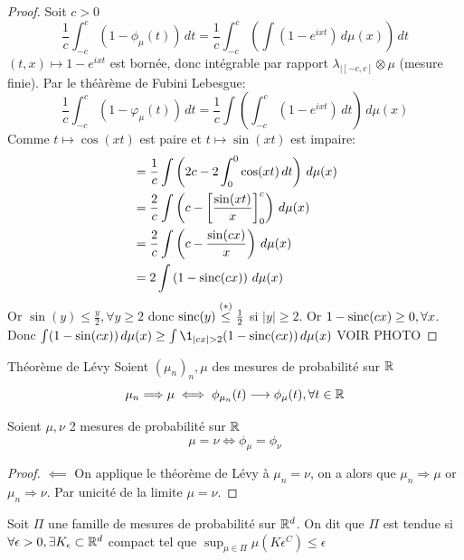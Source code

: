 \documentclass[]{report}
\begin{document}
    \begin{proof}
        Soit $c>0$
        \[\frac{1}{c}\int_{-c}^{c}(1-\phi_\mu(t))\,dt=\frac{1}{c}\int_{-c}^{c}\left(\int (1-e^{ixt})\,d\mu(x)\right)\,dt\]
        $(t,x)\mapsto 1-e^{ixt}$ est bornée, donc intégrable par rapport $\lambda_{|[-c,c]}\otimes \mu$ (mesure finie). Par le théàrème de Fubini Lebesgue:
        \[\frac{1}{c}\int_{-c}^{c}(1-\varphi_\mu(t))\,dt=\frac{1}{c}\int \left(\int_{-c}^{c}(1-e^{ixt})\,dt\right)\,d\mu(x)\]
        Comme $t\mapsto \cos(xt)$ est paire et $t\mapsto \sin(xt)$ est impaire:
        \begin{align*}
            &=\frac{1}{c}\int \left(2c-2\int_{0}^{0}\cos(xt)\,dt\right)\, d\mu(x)\\
            &=\frac{2}{c}\int \left(c-\left[\frac{\sin(xt)}{x}\right]_0^c\right) \,d\mu(x)\\
            &=\frac{2}{c}\int \left(c-\frac{\sin (cx)}{x}\right)\,d\mu(x)\\
            &=2\int \left(1-\text{sinc}(cx)\right)\,d\mu(x)
        \end{align*}
        Or $\sin(y)\le \frac{y}{2},\forall y\ge 2$ donc $\text{sinc}(y)\overset{(*)}{\le}\frac{1}{2}$ si $|y|\ge 2$. Or $1-\text{sinc} (cx)\ge 0, \forall x$.\\
        Donc $\int (1-\sin(cx))\,d\mu(x)\ge \int \1_{|cx|>2}(1-\sinc(cx))\,d\mu(x)$
        VOIR PHOTO
    \end{proof}

    \begin{tm}{Théorème de Lévy}{}
        Soient $(\mu_n)_n,\mu$ des mesures de probabilité sur $\mathbb{R}$
        \[\mu_n\Longrightarrow\mu \iff \phi_{\mu_n}(t)\longrightarrow \phi_\mu(t),\forall t\in \mathbb{R}\]
    \end{tm}

    \begin{cor}{}{}
        Soient $\mu,\nu$ 2 mesures de probabilité sur $\mathbb{R}$
        \[\mu=\nu \iff \phi_\mu=\phi_\nu\]
    \end{cor}

    \begin{proof}
        $\impliedby$ On applique le théorème de Lévy à $\mu_n=\nu$, on a alors que $\mu_n\Longrightarrow \mu$ or $\mu_n\Longrightarrow \nu$. Par unicité de la limite $\mu=\nu$.
    \end{proof}

    \begin{df}{}{}
        Soit $\Pi$ une famille de mesures de probabilité sur $\mathbb{R}^d$. On dit que $\Pi$ est tendue si $\forall \epsilon>0,\exists K_\epsilon\subset \mathbb{R}^d$ compact tel que $\sup_{\mu\in \Pi}\mu(K\epsilon^C)\le \epsilon$
    \end{df}
\end{document}
